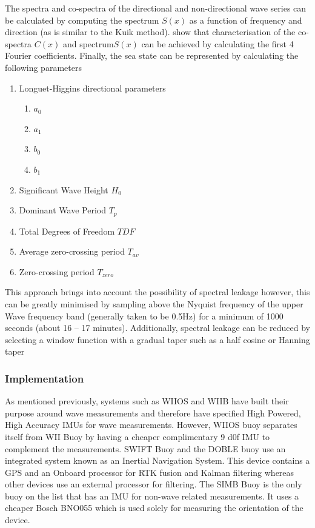 The spectra and co-spectra of the directional and non-directional wave series can be calculated by computing the spectrum $S(x)$ as a function of frequency and direction (as is similar to the Kuik method). \textcite{earle1996nondirectional} show that characterisation of the co-spectra $C(x)$ and spectrum$S(x)$ can be achieved by calculating the first 4 Fourier coefficients. Finally, the sea state can be represented by calculating the following parameters

\begin{enumerate}
 \item Longuet-Higgins directional parameters
    \begin{enumerate}
        \item $a_0$
        \item $a_1$
        \item $b_0$
        \item $b_1$
    \end{enumerate}
    \item Significant Wave Height $H_0$
     \item Dominant Wave Period $T_p$
     \item Total Degrees of Freedom $TDF$
     \item Average zero-crossing period $T_{av}$
     \item Zero-crossing period $T_{zero}$
\end{enumerate}
 This approach brings into account the possibility of spectral leakage however, this can be greatly minimised by sampling above the Nyquist frequency of the upper Wave frequency band (generally taken to be 0.5Hz) for a minimum of 1000 seconds (about 16 – 17 minutes). Additionally, spectral leakage can be reduced by selecting a window function with a gradual taper such as a half cosine or Hanning taper \cite{welch1967use}\par

\subsubsection{Implementation}
As mentioned previously, systems such as WIIOS and WIIB have built their purpose around wave measurements and therefore have specified High Powered, High Accuracy IMUs for wave measurements. However, WIIOS buoy separates itself from WII Buoy by having a cheaper complimentary 9 d0f IMU to complement the measurements. SWIFT Buoy and the DOBLE buoy use an integrated system known as an Inertial Navigation System. This device contains a GPS and an Onboard processor for RTK fusion and Kalman filtering whereas other devices use an external processor for filtering. The SIMB Buoy is the only buoy on the list that has an IMU for non-wave related measurements. It uses a cheaper Bosch BNO055 which is used solely for measuring the orientation of the device.

